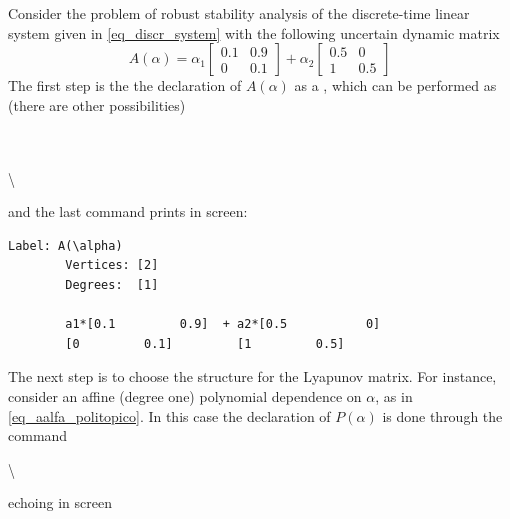 \documentclass[english,11pt]{article}
\theoremstyle{break} \theorembodyfont{\small\rm}
\begin{document}
Consider the problem of robust stability analysis of the discrete-time linear system given in \eqref{eq_discr_system} with the following uncertain dynamic matrix
\[
A(\alpha)=\alpha_1\begin{bmatrix}0.1 & 0.9 \\0 & 0.1 \end{bmatrix} + \alpha_2\begin{bmatrix}0.5 & 0 \\1 & 0.5 \end{bmatrix}
\]
The first step is the the declaration of $A(\alpha)$ as a , which can be performed as (there are other possibilities)

\vspace{0.5cm}%
\begin{minipage}{8.5cm}
	\\
	\\
	\textbackslash{}
\end{minipage}
\vspace{0.2cm}

\noindent and the last command prints in screen:

\begin{minipage}{11.2cm}
	\begin{lstlisting}[rulecolor=\color{red}]
		Label: A(\alpha)
		Vertices: [2]
		Degrees:  [1]

		a1*[0.1         0.9]  + a2*[0.5           0]
		[0         0.1]         [1         0.5]
	\end{lstlisting}
\end{minipage}

The next step is to choose the structure for the Lyapunov matrix. For instance, consider an affine (degree one) polynomial dependence on $\alpha$, as in \eqref{eq_aalfa_politopico}. In this case the declaration of $P(\alpha)$ is done through the command

\vspace{0.5cm}%
\begin{minipage}{8.5cm}
	\textbackslash{}\\
\end{minipage}
\vspace{0.2cm}

\noindent echoing in screen
\end{document}

